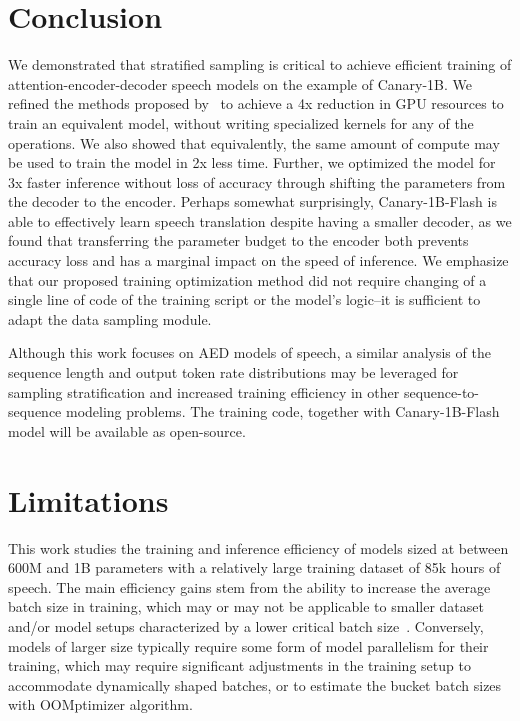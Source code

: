 \documentclass[11pt]{article}
\begin{document}
\section{Conclusion}
\label{sec:conclusion}

We demonstrated that stratified sampling is critical to achieve efficient training of attention-encoder-decoder speech models on the example of Canary-1B. 
We refined the methods proposed by~\citet{zelasko2021lhotse,puvvada24_interspeech,zelasko2024emmett} to achieve a 4x reduction in GPU resources to train an equivalent model, without writing specialized kernels for any of the operations. 
We also showed that equivalently, the same amount of compute may be used to train the model in 2x less time.
Further, we optimized the model for 3x faster inference without loss of accuracy through shifting the parameters from the decoder to the encoder.
Perhaps somewhat surprisingly, Canary-1B-Flash is able to effectively learn speech translation despite having a smaller decoder, as we found that transferring the parameter budget to the encoder both prevents accuracy loss and has a marginal impact on the speed of inference.
We emphasize that our proposed training optimization method did not require changing of a single line of code of the training script or the model's logic--it is sufficient to adapt the data sampling module.

Although this work focuses on AED models of speech, a similar analysis of the sequence length and output token rate distributions may be leveraged for sampling stratification and increased training efficiency in other sequence-to-sequence modeling problems.
The training code, together with Canary-1B-Flash model will be available as open-source.

\section*{Limitations}

This work studies the training and inference efficiency of models sized at between 600M and 1B parameters with a relatively large training dataset of 85k hours of speech. 
The main efficiency gains stem from the ability to increase the average batch size in training, which may or may not be applicable to smaller dataset and/or model setups characterized by a lower critical batch size~\cite{mccandlish2018empiricalmodellargebatchtraining,shallue2019measuring,zhang2024doescriticalbatchsize}. 
Conversely, models of larger size typically require some form of model parallelism for their training, which may require significant adjustments in the training setup to accommodate dynamically shaped batches, or to estimate the bucket batch sizes with OOMptimizer algorithm.
\end{document}
